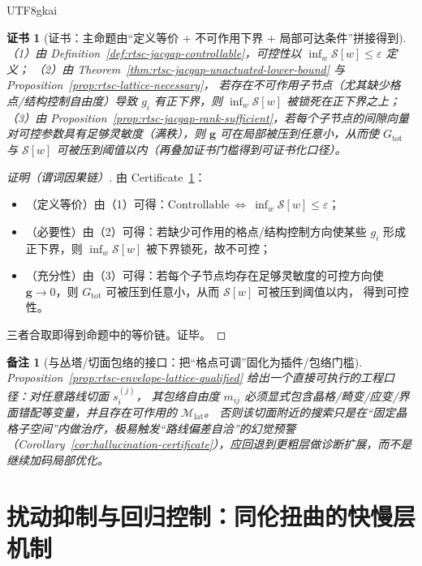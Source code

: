 \documentclass[12pt]{article}
\newtheorem{remark}{备注}[section]
\newtheorem{certificate}{证书}[section]
\begin{document}
\begin{CJK*}{UTF8}{gkai}
\begin{certificate}[证书：主命题由“定义等价 + 不可作用下界 + 局部可达条件”拼接得到]
\label{cert:rtsc-jacgap-controllability-main}
（1）由 Definition~\ref{def:rtsc-jacgap-controllable}，可控性以 $\inf_w\mathcal{S}[w]\le \varepsilon$ 定义；
（2）由 Theorem~\ref{thm:rtsc-jacgap-unactuated-lower-bound} 与 Proposition~\ref{prop:rtsc-lattice-necessary}，
  若存在不可作用子节点（尤其缺少格点/结构控制自由度）导致 $g_i$ 有正下界，则 $\inf_w\mathcal{S}[w]$ 被锁死在正下界之上；
（3）由 Proposition~\ref{prop:rtsc-jacgap-rank-sufficient}，若每个子节点的间隙向量对可控参数具有足够灵敏度（满秩），则 $\mathbf{g}$ 可在局部被压到任意小，从而使
  $G_{\mathrm{tot}}$ 与 $\mathcal{S}[w]$ 可被压到阈值以内（再叠加证书门槛得到可证书化口径）。
\end{certificate}

\begin{proof}[证明（谓词因果链）]
由 Certificate~\ref{cert:rtsc-jacgap-controllability-main}：
\begin{itemize}
  \item（定义等价）由（1）可得：$\mathrm{Controllable}\ \Leftrightarrow\ \inf_w\mathcal{S}[w]\le \varepsilon$；
  \item（必要性）由（2）可得：若缺少可作用的格点/结构控制方向使某些 $g_i$ 形成正下界，则 $\inf_w\mathcal{S}[w]$ 被下界锁死，故不可控；
  \item（充分性）由（3）可得：若每个子节点均存在足够灵敏度的可控方向使 $\mathbf{g}\to 0$，则 $G_{\mathrm{tot}}$ 可被压到任意小，从而 $\mathcal{S}[w]$ 可被压到阈值以内，
    得到可控性。
\end{itemize}
三者合取即得到命题中的等价链。证毕。
\end{proof}

\begin{remark}[与丛塔/切面包络的接口：把“格点可调”固化为插件/包络门槛]
Proposition~\ref{prop:rtsc-envelope-lattice-qualified} 给出一个直接可执行的工程口径：对任意路线切面 $s_i^{(j)}$，
其包络自由度 $m_{ij}$ 必须显式包含晶格/畸变/应变/界面错配等变量，并且存在可作用的 $\mathcal{M}_{\mathrm{lat}}$。
否则该切面附近的搜索只是在“固定晶格子空间”内做治疗，极易触发“路线偏差自洽”的幻觉预警（Corollary~\ref{cor:hallucination-certificate}），应回退到更粗层做诊断扩展，而不是继续加码局部优化。
\end{remark}

\section{扰动抑制与回归控制：同伦扭曲的快慢层机制}
\label{sec:rtsc-disturbance-regression}


\end{CJK*}
\end{document}
